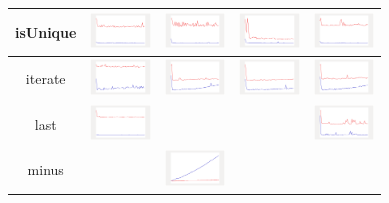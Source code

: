 \begin{longtable}{ c|c c c c}
isUnique
&
\includegraphics[width=1.6cm]{../graphs/sequence/small/isUnique}
&
\includegraphics[width=1.6cm]{../graphs/set/small/isUnique}
&
\includegraphics[width=1.6cm]{../graphs/bag/small/isUnique}
&
\includegraphics[width=1.6cm]{../graphs/orderedset/small/isUnique}
\\\hline

iterate
&
\includegraphics[width=1.6cm]{../graphs/sequence/small/Iterate}
&
\includegraphics[width=1.6cm]{../graphs/set/small/Iterate}
&
\includegraphics[width=1.6cm]{../graphs/bag/small/Iterate}
&
\includegraphics[width=1.6cm]{../graphs/orderedset/small/Iterate}
\\\hline

last
&
\includegraphics[width=1.6cm]{../graphs/sequence/small/Last}
&
&
&
\includegraphics[width=1.6cm]{../graphs/orderedset/small/Last}
\\\hline

minus
&
&
\includegraphics[width=1.6cm]{../graphs/set/small/Minus}
&
&
\\\hline


\end{longtable}
